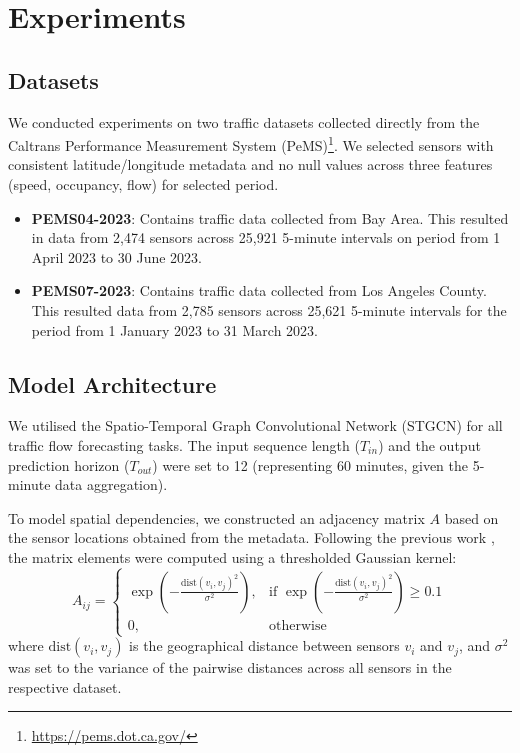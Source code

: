 \section{Experiments}

\subsection{Datasets}
We conducted experiments on two traffic datasets collected directly from the Caltrans Performance Measurement System (PeMS)\footnote{\url{https://pems.dot.ca.gov/}}. We selected sensors with consistent latitude/longitude metadata and no null values across three features (speed, occupancy, flow) for selected period.
\begin{itemize}
    \item \textbf{PEMS04-2023}: Contains traffic data collected from Bay Area. This resulted in data from 2,474 sensors across 25,921 5-minute intervals on period from 1 April 2023 to 30 June 2023.
    \item \textbf{PEMS07-2023}: Contains traffic data collected from Los Angeles County. This resulted data from 2,785 sensors across 25,621 5-minute intervals for the period from 1 January 2023 to 31 March 2023.
\end{itemize}


\subsection{Model Architecture}
We utilised the Spatio-Temporal Graph Convolutional Network (STGCN) \cite{yu_spatio-temporal_2018} for all traffic flow forecasting tasks. The input sequence length ($T_{in}$) and the output prediction horizon ($T_{out}$) were set to 12 (representing 60 minutes, given the 5-minute data aggregation).

To model spatial dependencies, we constructed an adjacency matrix $A$ based on  the sensor locations obtained from the metadata. Following the previous work \cite{li_diffusion_2018, liu_largest_2023}, the matrix elements were computed using a thresholded Gaussian kernel:
\begin{equation}
A_{ij} = \begin{cases}
\exp\left(-\frac{\text{dist}(v_i, v_j)^2}{\sigma^2}\right), & \text{if } \exp\left(-\frac{\text{dist}(v_i, v_j)^2}{\sigma^2}\right) \ge 0.1 \\
0, & \text{otherwise}
\end{cases}
\end{equation}
where $\text{dist}(v_i, v_j)$ is the geographical distance between sensors $v_i$ and $v_j$, and $\sigma^2$ was set to the variance of the pairwise distances across all sensors in the respective dataset.

